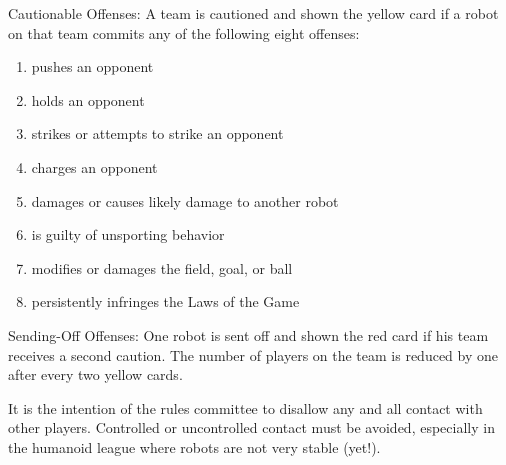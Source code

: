 \documentclass[12pt]{hurocup}
\begin{document}
\label{law:penalties}

\begin{lawlist}
\item Cautionable Offenses: A team is cautioned and shown the yellow
  card if a robot on that team commits any of the following eight
  offenses:
  \begin{enumerate}
  \item pushes an opponent
  \item holds an opponent
  \item strikes or attempts to strike an opponent
  \item charges an opponent
  \item damages or causes likely damage to another robot
  \item is guilty of unsporting behavior
  \item modifies or damages the field, goal, or ball
  \item persistently infringes the Laws of the Game
  \end{enumerate}
\item Sending-Off Offenses: One robot is sent off and shown the red
  card if his team receives a second caution. The number of players on
  the team is reduced by one after every two yellow cards.
\end{lawlist}

\begin{decisions}
\item It is the intention of the rules committee to disallow any
  and all contact with other players. Controlled or uncontrolled
  contact must be avoided, especially in the humanoid league where
  robots are not very stable (yet!).
\end{decisions}

\label{law:penalty-kick}
\end{document}
